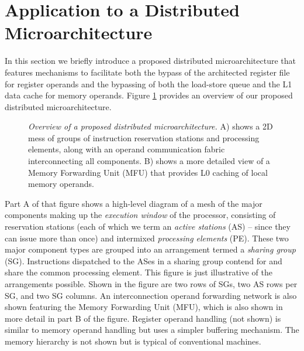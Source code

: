 \documentclass[10pt,dvips]{article}
\begin{document}
\section{Application to a Distributed Microarchitecture}
%
In this section we briefly introduce a proposed distributed
microarchitecture that features mechanisms to facilitate both
the bypass of the architected register file for register operands
and the bypassing of both the load-store queue and the L1 data
cache for memory operands.
Figure \ref{fig:overview} provides an overview of our
proposed distributed microarchitecture.  
%
\begin{figure}
\centering
{}
\caption{{\em Overview of a proposed distributed microarchitecture.} 
A) shows a 2D mess of groups of instruction reservation stations
and processing elements, along with an operand communication
fabric interconnecting all components.  B) shows a more detailed
view of a Memory Forwarding Unit (MFU) that provides L0 caching
of local memory operands.}
\label{fig:overview}
\end{figure}
%
Part A of that figure
shows a high-level diagram of a mesh of the major components
making up the \textit{execution window} of the processor, consisting of
reservation stations
(each of which we term an \textit{active stations} (AS) -- since they
can issue more than once) and intermixed \textit{processing elements}
(PE).  
These two major component types are grouped into an arrangement
termed a \textit{sharing group} (SG).  Instructions dispatched
to the ASes in a sharing group contend for and share the common
processing element.
This figure is just illustrative of the arrangements possible.
Shown in the figure 
are two rows of SGs, two AS rows per SG, and two SG columns.
An interconnection operand forwarding network is also shown
featuring the Memory Forwarding Unit (MFU), which is also
shown in more detail in part B of the figure.
Register operand handling (not shown) is similar to memory operand handling
but uses a simpler buffering mechanism.
The memory hierarchy is not shown but is typical of conventional
machines.
\end{document}
